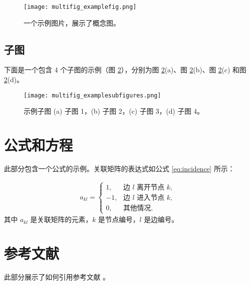 \documentclass[a4paper,UTF8]{ctexart}
\begin{document}
\begin{figure}[htbp]
    \centering
    \texttt{[image: multifig\_examplefig.png]}
    \caption{
        一个示例图片，展示了概念图。
    }
    \label{multifig:multifig_examplefig}
\end{figure}


\subsection{子图}

下面是一个包含 4 个子图的示例（图 \ref{multifig:multifig_examplesubfigures}），分别为图 \ref{multifig:multifig_examplesubfigures}(a)、图 \ref{multifig:multifig_examplesubfigures}(b)、图 \ref{multifig:multifig_examplesubfigures}(c) 和图 \ref{multifig:multifig_examplesubfigures}(d)。


\begin{figure}[htbp]
    \centering
    \texttt{[image: multifig\_examplesubfigures.png]}
    \caption{
        示例子图 (a) 子图 1，(b) 子图 2，(c) 子图 3，(d) 子图 4。
    }
    \label{multifig:multifig_examplesubfigures}
\end{figure}


\section{公式和方程}

此部分包含一个公式的示例。关联矩阵的表达式如公式 \ref{eq:incidence} 所示：

\begin{align}\label{eq:incidence}
    a_{kl}=
    \begin{cases}
        1,  & \text{边 $l$ 离开节点 $k$},\\
        -1, & \text{边 $l$ 进入节点 $k$},\\
        0,  & \text{其他情况},
    \end{cases}
\end{align}
其中 $a_{kl}$ 是关联矩阵的元素，$k$ 是节点编号，$l$ 是边编号。

\section{参考文献}

此部分展示了如何引用参考文献 \cite{article1}。



\end{document}
